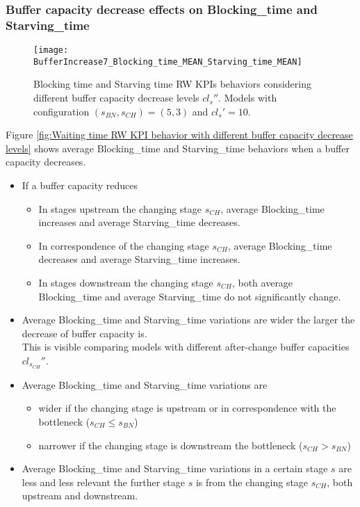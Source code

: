 \subsubsection{Buffer capacity decrease effects on Blocking\_time and Starving\_time}
\begin{figure}[h] 
\centering
\texttt{[image: BufferIncrease7\_Blocking\_time\_MEAN\_Starving\_time\_MEAN]}
\caption[Blocking time and Starving time RW KPIs behaviors with different buffer capacity decrease levels]{Blocking time and Starving time RW KPIs behaviors considering different buffer capacity decrease levels $cl_s''$. Models with configuration $(s_{BN},s_{CH})=(5,3)$ and $cl_s'=10$.}
\label{fig:Blocking time and Starving time RW KPIs behaviors with different buffer capacity decrease levels}
\end{figure}
Figure \ref{fig:Waiting time RW KPI behavior with different buffer capacity decrease levels} shows average Blocking\_time and Starving\_time behaviors when a buffer capacity decreases.
\begin{itemize}
\item If a buffer capacity reduces 
\begin{itemize}
\item In stages upstream the changing stage $s_{CH}$, average Blocking\_time increases and average Starving\_time decreases.
\item In correspondence of the changing stage $s_{CH}$, average Blocking\_time decreases and average Starving\_time increases.
\item In stages downstream the changing stage $s_{CH}$, both average Blocking\_time and average Starving\_time do not significantly change.
\end{itemize}
\item Average Blocking\_time and Starving\_time variations are wider the larger the decrease of buffer capacity is. \\This is visible comparing models with different after-change buffer capacities $cl_{s_{CH}}''$. 
\item Average  Blocking\_time and Starving\_time variations are 
\begin{itemize}
\item wider if the changing stage is upstream or in correspondence with the bottleneck ($s_{CH} \leqslant s_{BN}$)
\item narrower if the changing stage is downstream the bottleneck ($s_{CH}>s_{BN}$)
\end{itemize}
\item Average  Blocking\_time and Starving\_time variations in a certain stage $s$ are less and less relevant the further stage $s$ is from the changing stage $s_{CH}$, both upstream and downstream. 
\end{itemize}
